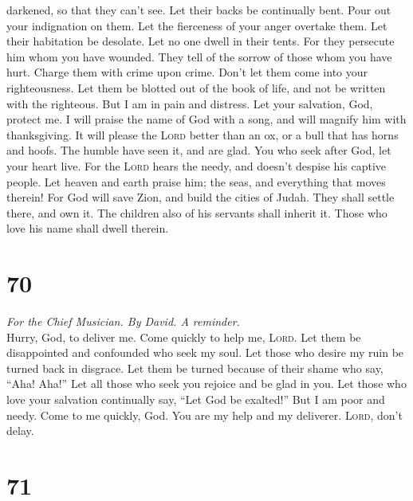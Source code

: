 darkened, so that they can't see. Let their backs be continually bent.
 Pour out your indignation on them. Let the fierceness of
your anger overtake them.  Let their habitation be
desolate. Let no one dwell in their tents.  For they
persecute him whom you have wounded. They tell of the sorrow of those
whom you have hurt.  Charge them with crime upon crime.
Don't let them come into your righteousness.  Let them be
blotted out of the book of life, and not be written with the righteous.
 But I am in pain and distress. Let your salvation, God,
protect me.  I will praise the name of God with a song,
and will magnify him with thanksgiving.  It will please
the \textsc{Lord} better than an ox, or a bull that has horns and hoofs.
 The humble have seen it, and are glad. You who seek
after God, let your heart live.  For the \textsc{Lord}
hears the needy, and doesn't despise his captive people. 
Let heaven and earth praise him; the seas, and everything that moves
therein!  For God will save Zion, and build the cities of
Judah. They shall settle there, and own it.  The children
also of his servants shall inherit it. Those who love his name shall
dwell therein.

\hypertarget{section-69}{%
\section{70}\label{section-69}}

\emph{For the Chief Musician. By David. A reminder.}\\
 Hurry, God, to deliver me. Come quickly to help me,
\textsc{Lord}.  Let them be disappointed and confounded
who seek my soul. Let those who desire my ruin be turned back in
disgrace.  Let them be turned because of their shame who
say, ``Aha! Aha!''  Let all those who seek you rejoice and
be glad in you. Let those who love your salvation continually say, ``Let
God be exalted!''  But I am poor and needy. Come to me
quickly, God. You are my help and my deliverer. \textsc{Lord}, don't
delay.

\hypertarget{section-70}{%
\section{71}\label{section-70}}

